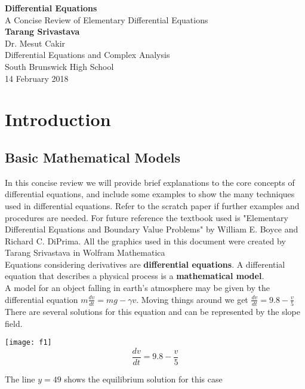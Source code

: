 \documentclass[11pt]{article}
\author{Tarang Srivastava}
\theoremstyle{definition}
\begin{document}
	\begin{titlepage}
		\begin{center}
			\vspace*{1cm}
			\Huge
			\textbf{Differential Equations}\\
			\vspace{0.5cm}
			\LARGE
			A Concise Review of Elementary Differential Equations\\
			\vspace{1.5cm}
			\textbf{Tarang Srivastava}\\
			\vfill
			\vspace{0.8cm}
			\Large
			Dr. Mesut Cakir\\
			Differential Equations and Complex Analysis\\
			South Brunswick High School\\
			14 February 2018
			
		\end{center}
	\end{titlepage}
	\tableofcontents	
	\pagebreak
	\section{Introduction}
	\subsection{Basic Mathematical Models}
	In this concise review we will provide brief explanations to the core concepts of differential equations, and include some examples to show the many techniques used in differential equations. Refer to the scratch paper if further examples and procedures are needed. For future reference the textbook used is "Elementary Differential Equations and Boundary Value Problems" by William E. Boyce and Richard C. DiPrima. All the graphics used in this document were created by Tarang Srivastava in Wolfram Mathematica \\
	
	Equations considering derivatives are \textbf{differential equations}. A differential equation that describes a physical process is a \textbf{mathematical model}. \\
	A model for an object falling in earth's atmosphere may be given by the differential equation $m \frac{dv}{dt} = mg - \gamma v$. Moving things around we get $\frac{dv}{dt} = 9.8 - \frac{v}{5}$ There are several solutions for this equation and can be represented by the slope field. \\
	\begin{center}
		\texttt{[image: f1]}
		$$\frac{dv}{dt} = 9.8 - \frac{v}{5}$$
	\end{center}
	The line $y=49$ shows the equilibrium solution for this case\\
\end{document}
